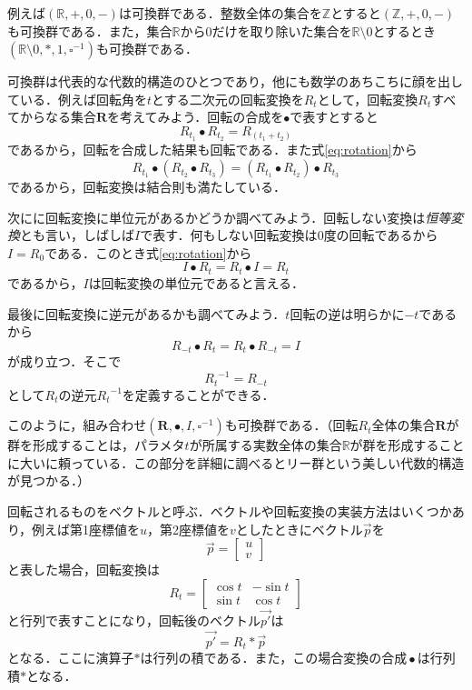 \documentclass[twocolumn]{jsbook}
\newcommand{\keyword}[1]{{\emph{#1}}}
\DeclareMathOperator{\mathCompose}{\bullet}
\newcommand{\mathSomething}{\square}
\newcommand{\mathSet}[1]{\mathbf{#1}}
\newcommand{\mathSpecialSet}[1]{\mathbb{#1}}
\newcommand{\mathVector}[1]{\vec{#1}}
\newcommand{\mathGroup}[4]{(#1,#2,#3,#4)}
\begin{document}
例えば$\mathGroup{\mathSpecialSet{R}}{+}{0}{-}$は可換群である．整数全体の集合を$\mathSpecialSet{Z}$とすると$\mathGroup{\mathSpecialSet{Z}}{+}{0}{-}$も可換群である．また，集合$\mathSpecialSet{R}$から$0$だけを取り除いた集合を$\mathSpecialSet{R}\setminus0$とするとき$\mathGroup{\mathSpecialSet{R}\setminus0}{*}{1}{\mathSomething^{-1}}$も可換群である．

可換群は代表的な代数的構造のひとつであり，他にも数学のあちこちに顔を出している．例えば回転角を$t$とする二次元の回転変換を$R_t$として，回転変換$R_t$すべてからなる集合$\mathSet{R}$を考えてみよう．回転の合成を$\bullet$で表すとすると
\begin{equation}
\label{eq:rotation}
R_{t_1}\bullet R_{t_2}=R_{(t_1+t_2)}
\end{equation}
であるから，回転を合成した結果も回転である．また式\eqref{eq:rotation}から$$R_{t_1}\bullet\left(R_{t_2}\bullet R_{t_3}\right)=\left(R_{t_1}\bullet R_{t_2}\right)\bullet R_{t_3}$$
であるから，回転変換は結合則も満たしている．

次にに回転変換に単位元があるかどうか調べてみよう．回転しない変換は\keyword{恒等変換}とも言い，しばしば$I$で表す．何もしない回転変換は$0$度の回転であるから$I=R_0$である．このとき式\eqref{eq:rotation}から$$I\bullet R_t=R_t\bullet I=R_t$$であるから，$I$は回転変換の単位元であると言える．

最後に回転変換に逆元があるかも調べてみよう．$t$回転の逆は明らかに$-t$であるから$$R_{-t}\bullet R_t=R_t\bullet R_{-t}=I$$が成り立つ．そこで$${R_t}^{-1}=R_{-t}$$として$R_t$の逆元${R_t}^{-1}$を定義することができる．

このように，組み合わせ$\mathGroup{\mathSet{R}}{\bullet}{I}{\mathSomething^{-1}}$も可換群である．（回転$R_t$全体の集合$\mathSet{R}$が群を形成することは，パラメタ$t$が所属する実数全体の集合$\mathSpecialSet{R}$が群を形成することに大いに頼っている．この部分を詳細に調べるとリー群という美しい代数的構造が見つかる．）

回転されるものをベクトルと呼ぶ．ベクトルや回転変換の実装方法はいくつかあり，例えば第1座標値を$u$，第2座標値を$v$としたときにベクトル$\mathVector{p}$を$$\mathVector{p}=\begin{bmatrix}u\\v\end{bmatrix}$$と表した場合，回転変換は$$R_t=\begin{bmatrix}\cos t&-\sin t\\\sin t&\cos t\end{bmatrix}$$と行列で表すことになり，回転後のベクトル$\mathVector{p'}$は$$\mathVector{p'}=R_t*\mathVector{p}$$となる．ここに演算子$*$は行列の積である．また，この場合変換の合成$\mathCompose$は行列積$*$となる．
\end{document}
